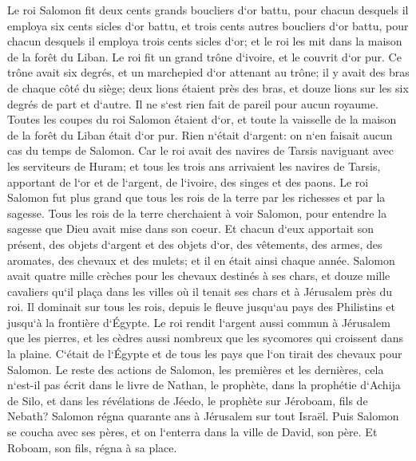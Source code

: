 \verse Le roi Salomon fit deux cents grands boucliers d`or battu, pour chacun desquels il employa six cents sicles d`or battu, 
\verse et trois cents autres boucliers d`or battu, pour chacun desquels il employa trois cents sicles d`or; et le roi les mit dans la maison de la forêt du Liban. 
\verse Le roi fit un grand trône d`ivoire, et le couvrit d`or pur. 
\verse Ce trône avait six degrés, et un marchepied d`or attenant au trône; il y avait des bras de chaque côté du siège; deux lions étaient près des bras, 
\verse et douze lions sur les six degrés de part et d`autre. Il ne s`est rien fait de pareil pour aucun royaume. 
\verse Toutes les coupes du roi Salomon étaient d`or, et toute la vaisselle de la maison de la forêt du Liban était d`or pur. Rien n`était d`argent: on n`en faisait aucun cas du temps de Salomon. 
\verse Car le roi avait des navires de Tarsis naviguant avec les serviteurs de Huram; et tous les trois ans arrivaient les navires de Tarsis, apportant de l`or et de l`argent, de l`ivoire, des singes et des paons. 
\verse Le roi Salomon fut plus grand que tous les rois de la terre par les richesses et par la sagesse. 
\verse Tous les rois de la terre cherchaient à voir Salomon, pour entendre la sagesse que Dieu avait mise dans son coeur. 
\verse Et chacun d`eux apportait son présent, des objets d`argent et des objets d`or, des vêtements, des armes, des aromates, des chevaux et des mulets; et il en était ainsi chaque année. 
\verse Salomon avait quatre mille crèches pour les chevaux destinés à ses chars, et douze mille cavaliers qu`il plaça dans les villes où il tenait ses chars et à Jérusalem près du roi. 
\verse Il dominait sur tous les rois, depuis le fleuve jusqu`au pays des Philistins et jusqu`à la frontière d`Égypte. 
\verse Le roi rendit l`argent aussi commun à Jérusalem que les pierres, et les cèdres aussi nombreux que les sycomores qui croissent dans la plaine. 
\verse C`était de l`Égypte et de tous les pays que l`on tirait des chevaux pour Salomon. 
\verse Le reste des actions de Salomon, les premières et les dernières, cela n`est-il pas écrit dans le livre de Nathan, le prophète, dans la prophétie d`Achija de Silo, et dans les révélations de Jéedo, le prophète sur Jéroboam, fils de Nebath? 
\verse Salomon régna quarante ans à Jérusalem sur tout Israël. 
\verse Puis Salomon se coucha avec ses pères, et on l`enterra dans la ville de David, son père. Et Roboam, son fils, régna à sa place. 

